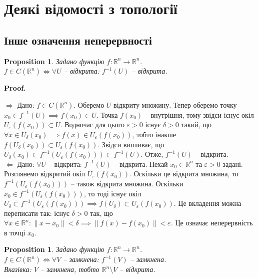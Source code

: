 \documentclass[a4paper, 10pt]{article}
\makeatletter
\def\qed{$\blacksquare$}
\def\rightproof{$\boxed{\Rightarrow}$ }
\def\leftproof{$\boxed{\Leftarrow}$ }
\theoremstyle{theoremdd}
\theoremstyle{theoremdd}
\theoremstyle{theoremdd}
\theoremstyle{theoremdd}
\theoremstyle{theoremdd}
\theoremstyle{theoremdd}
\theoremstyle{theoremdd}
\theoremstyle{theoremdd}
\theoremstyle{theoremdd}
\newtheorem{proposition}[theorem]{Proposition}
\theoremstyle{theoremdd}
\theoremstyle{theoremdd}
\theoremstyle{theoremdd}
\theoremstyle{theoremdd}
\theoremstyle{theoremdd}
\theoremstyle{theoremdd}
\renewenvironment{proof}[1][Proof.\\]{\par
\pushQED{\hfill \qed}%
\normalfont \topsep6\p@\@plus6\p@\relax
\trivlist
\item\relax
{\bfseries
#1\@addpunct{.}}\hspace\labelsep\ignorespaces
}{%
\popQED\endtrivlist\@endpefalse
}
\makeatother
\begin{document}
%
\tableofcontents
\newpage

\iffalse %
\section{Деякі відомості з топології}
\subsection{Інше означення неперервності}
\begin{proposition}
Задано функцію $f \colon \mathbb{R}^n \to \mathbb{R}^n$.\\
$f \in C(\mathbb{R}^n) \iff \forall U$ -- відкрита: $f^{-1}(U)$ -- відкрита.
\end{proposition}

\begin{proof}
\rightproof Дано: $f \in C(\mathbb{R}^n)$. Оберемо $U$ відкриту множину. Тепер оберемо точку $x_0 \in f^{-1}(U) \implies f(x_0) \in U$. Точка $f(x_0)$ -- внутрішня, тому звідси існує окіл $U_\varepsilon(f(x_0)) \subset U$. Водночас для цього $\varepsilon > 0$ існує $\delta > 0$ такий, що $\forall x \in U_\delta(x_0) \implies f(x) \in U_\varepsilon(f(x_0))$, тобто інакше $f(U_\delta(x_0)) \subset U_\varepsilon(f(x_0))$. Звідси випливає, що $U_\delta(x_0) \subset f^{-1}(U_\varepsilon (f(x_0))) \subset f^{-1}(U)$. Отже, $f^{-1}(U)$ -- відкрита.
\bigskip \\
\leftproof Дано: $\forall U$ -- відкрита: $f^{-1}(U)$ -- відкрита. Нехай $x_0 \in \mathbb{R}^n$ та $\varepsilon > 0$ задані. Розглянемо відкритий окіл $U_\varepsilon(f(x_0))$. Оскільки це відкрита множина, то $f^{-1}(U_\varepsilon(f(x_0)))$ -- також відкрита множина. Оскільки $x_0 \in f^{-1}(U_\varepsilon(f(x_0)))$, то тоді існує окіл $U_\delta \subset f^{-1}(U_\varepsilon(f(x_0))) \implies f(U_\delta) \subset U_\varepsilon(f(x_0))$. Це вкладення можна переписати так: існує $\delta > 0$ так, що $\forall x \in \mathbb{R}^n: \|x - x_0 \| < \delta \implies \|f(x) - f(x_0)\| < \varepsilon$. Це означає неперервність в точці $x_0$.
\end{proof}

\begin{proposition}
Задано функцію $f \colon \mathbb{R}^n \to \mathbb{R}^n$.\\
$f \in C(\mathbb{R}^n) \iff \forall V$ -- замкнена: $f^{-1}(V)$ -- замкнена.\\
\textit{Вказівка: $V$ -- замкнена, тобто $\mathbb{R}^n \setminus V$ -- відкрита.}
\end{proposition}
\end{document}
